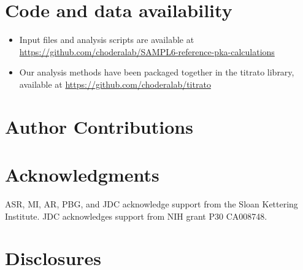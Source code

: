 \documentclass[9pt,lineno,final]{elife}
\begin{document}

\section{Code and data availability}

\begin{itemize}
	\item Input files and analysis scripts are available at \href{https://github.com/choderalab/SAMPL6-reference-pka-calculations}{https://github.com/choderalab/SAMPL6-reference-pka-calculations}
	\item Our analysis methods have been packaged together in the titrato library, available at \href{https://github.com/choderalab/titrato}{https://github.com/choderalab/titrato}
\end{itemize}

\section{Author Contributions}


\section{Acknowledgments}

ASR, MI, AR, PBG, and JDC acknowledge support from the Sloan Kettering Institute.
JDC acknowledges support from NIH grant P30 CA008748.

\section{Disclosures}
\end{document}
